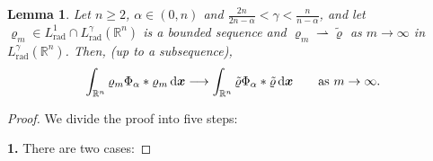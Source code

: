 \documentclass[reqno,11pt]{amsart}
\numberwithin{equation}{section}
\newtheorem{lemma}[theorem]{Lemma}
\theoremstyle{definition}
\def\dd{{\, \rm d}}
\begin{document}
\begin{lemma}\label{weaktostrong}
    Let $n \geq 2$, $\alpha \in (0,n)$ and $\frac{2n}{2n - \alpha} <\gamma < \frac{n}{n - \alpha}$, 
    and let $\varrho_m \in L^1_{\text{rad}} \cap L^\gamma_{\text{rad}} (\mathbb{R}^n)$ 
    is a bounded sequence and $\varrho_m \rightharpoonup \tilde{\varrho}$ as $m \to \infty$ in $L^\gamma_{\text{rad}}(\mathbb{R}^n)$. Then, {\rm(}up to a subsequence{\rm)},
    \[
 \int_{\mathbb{R}^n} \varrho_m \Phi_\alpha * \varrho_m \dd \boldsymbol{x} \longrightarrow \int_{\mathbb{R}^n} \tilde{\varrho} \Phi_\alpha * \tilde{\varrho} \dd \boldsymbol{x}
 \qquad \mbox{as $m \to \infty$}.
     \]
\end{lemma}

\begin{proof} We divide the proof into five steps:

\medskip
\noindent
{\bf 1.} There are two cases:


\end{proof}
\end{document}

